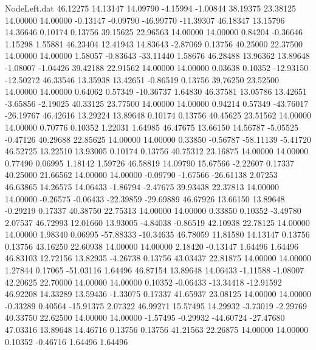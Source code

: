 \begin{filecontents}{NodeLeft.dat}
  46.12275   14.13147   14.09790    -4.15994   -1.00844   38.19375   23.38125   14.00000   14.00000   -0.13147   -0.09790  -46.99770  -11.39307
  46.18347   13.15796   14.36646     0.10174    0.13756   39.15625   22.96563   14.00000   14.00000    0.84204   -0.36646    1.15298    1.55881
  46.23404   12.41943   14.83643    -2.87069    0.13756   40.25000   22.37500   14.00000   14.00000    1.58057   -0.83643  -33.11440    1.58676
  46.28488   13.96362   13.89648    -1.08007   -1.04426   39.42188   22.91562   14.00000   14.00000    0.03638    0.10352  -12.93150  -12.50272
  46.33546   13.35938   13.42651    -0.86519    0.13756   39.76250   23.52500   14.00000   14.00000    0.64062    0.57349  -10.36737    1.64830
  46.37581   13.05786   13.42651    -3.65856   -2.19025   40.33125   23.77500   14.00000   14.00000    0.94214    0.57349  -43.76017  -26.19767
  46.42616   13.29224   13.89648     0.10174    0.13756   40.45625   23.51562   14.00000   14.00000    0.70776    0.10352    1.22031    1.64985
  46.47675   13.66150   14.56787    -5.05525   -0.47126   40.29688   22.85625   14.00000   14.00000    0.33850   -0.56787  -58.11139   -5.41720
  46.52725   13.22510   13.93005     0.10174    0.13756   40.75312   23.16875   14.00000   14.00000    0.77490    0.06995    1.18142    1.59726
  46.58819   14.09790   15.67566    -2.22607    0.17337   40.25000   21.66562   14.00000   14.00000   -0.09790   -1.67566  -26.61138    2.07253
  46.63865   14.26575   14.06433    -1.86794   -2.47675   39.93438   22.37813   14.00000   14.00000   -0.26575   -0.06433  -22.39859  -29.69889
  46.67926   13.66150   13.89648    -0.29219    0.17337   40.38750   22.75313   14.00000   14.00000    0.33850    0.10352   -3.49780    2.07537
  46.72993   12.01660   13.93005    -4.84038   -0.86519   42.10938   22.78125   14.00000   14.00000    1.98340    0.06995  -57.88333  -10.34635
  46.78059   11.81580   14.13147     0.13756    0.13756   43.16250   22.60938   14.00000   14.00000    2.18420   -0.13147    1.64496    1.64496
  46.83103   12.72156   13.82935    -4.26738    0.13756   43.03437   22.81875   14.00000   14.00000    1.27844    0.17065  -51.03116    1.64496
  46.87154   13.89648   14.06433    -1.11588   -1.08007   42.20625   22.70000   14.00000   14.00000    0.10352   -0.06433  -13.34418  -12.91592
  46.92208   14.33289   13.59436    -1.33075    0.17337   41.65937   23.08125   14.00000   14.00000   -0.33289    0.40564  -15.91375    2.07322
  46.99271   15.57495   14.29932    -3.73019   -2.29769   40.33750   22.62500   14.00000   14.00000   -1.57495   -0.29932  -44.60724  -27.47680
  47.03316   13.89648   14.46716     0.13756    0.13756   41.21563   22.26875   14.00000   14.00000    0.10352   -0.46716    1.64496    1.64496

\end{filecontents}
